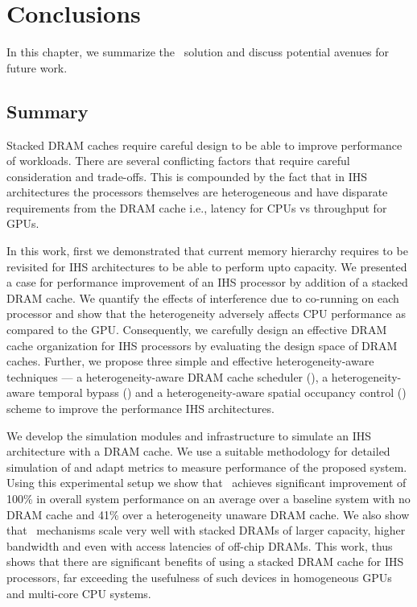 \chapter{Conclusions} \label{chap:conclusion}
In this chapter, we summarize the \cachename\ solution and discuss potential avenues for future work.
\section{Summary}
Stacked DRAM caches require careful design to be able to improve performance of workloads. There are several conflicting factors that require careful consideration and trade-offs. This is compounded by the fact that in IHS architectures the processors themselves are  heterogeneous and have disparate requirements from the DRAM cache i.e., latency for CPUs vs throughput for GPUs.
\par In this work, first we demonstrated that current memory hierarchy requires to be revisited for IHS architectures to be able to perform upto capacity. We presented a case for performance improvement of an IHS processor by addition of a stacked DRAM cache. 
We quantify the effects of interference due to co-running on each processor and show that the heterogeneity adversely affects CPU performance as compared to the GPU. 
Consequently, we carefully design an effective DRAM cache organization for IHS processors by evaluating the design space of DRAM caches.
Further, we propose three simple and effective heterogeneity-aware techniques --- a heterogeneity-aware DRAM cache scheduler (\prioname), a heterogeneity-aware temporal bypass (\bypassname) and a heterogeneity-aware spatial occupancy control (\chaining) scheme to improve the performance IHS architectures.
\par We develop the simulation modules and infrastructure to simulate an IHS architecture with a DRAM cache. We use a suitable methodology for detailed simulation of \cachename and adapt metrics to measure performance of the proposed system. Using this experimental setup we show that 
\cachename\ achieves significant improvement of 100\% in overall system performance on an average over a baseline system with no DRAM cache and 41\% over a heterogeneity unaware DRAM cache. 
We also show that \cachename\ mechanisms scale very well with stacked DRAMs of larger capacity, higher bandwidth and even with access latencies of off-chip DRAMs.
This work, thus shows that there are significant benefits of using a stacked DRAM cache for IHS processors, far exceeding the usefulness of such devices in homogeneous GPUs and multi-core CPU systems.

